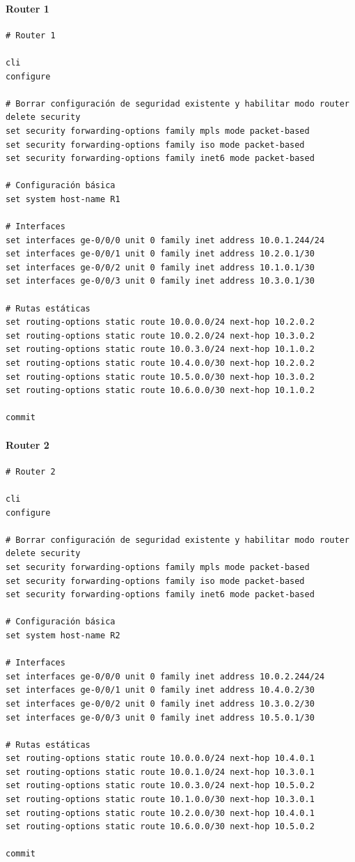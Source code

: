 \documentclass[%
    school=etsisi,%
    degree=61TI,%
]{upm-report}
\begin{document}
\paragraph{Router 1}

\begin{lstlisting}[breaklines]
# Router 1

cli
configure

# Borrar configuración de seguridad existente y habilitar modo router
delete security
set security forwarding-options family mpls mode packet-based
set security forwarding-options family iso mode packet-based
set security forwarding-options family inet6 mode packet-based

# Configuración básica
set system host-name R1

# Interfaces
set interfaces ge-0/0/0 unit 0 family inet address 10.0.1.244/24
set interfaces ge-0/0/1 unit 0 family inet address 10.2.0.1/30
set interfaces ge-0/0/2 unit 0 family inet address 10.1.0.1/30
set interfaces ge-0/0/3 unit 0 family inet address 10.3.0.1/30

# Rutas estáticas
set routing-options static route 10.0.0.0/24 next-hop 10.2.0.2
set routing-options static route 10.0.2.0/24 next-hop 10.3.0.2
set routing-options static route 10.0.3.0/24 next-hop 10.1.0.2
set routing-options static route 10.4.0.0/30 next-hop 10.2.0.2
set routing-options static route 10.5.0.0/30 next-hop 10.3.0.2
set routing-options static route 10.6.0.0/30 next-hop 10.1.0.2

commit
\end{lstlisting}

\paragraph{Router 2}

\begin{lstlisting}[breaklines]
# Router 2

cli
configure

# Borrar configuración de seguridad existente y habilitar modo router
delete security
set security forwarding-options family mpls mode packet-based
set security forwarding-options family iso mode packet-based
set security forwarding-options family inet6 mode packet-based

# Configuración básica
set system host-name R2

# Interfaces
set interfaces ge-0/0/0 unit 0 family inet address 10.0.2.244/24
set interfaces ge-0/0/1 unit 0 family inet address 10.4.0.2/30
set interfaces ge-0/0/2 unit 0 family inet address 10.3.0.2/30
set interfaces ge-0/0/3 unit 0 family inet address 10.5.0.1/30

# Rutas estáticas
set routing-options static route 10.0.0.0/24 next-hop 10.4.0.1
set routing-options static route 10.0.1.0/24 next-hop 10.3.0.1
set routing-options static route 10.0.3.0/24 next-hop 10.5.0.2
set routing-options static route 10.1.0.0/30 next-hop 10.3.0.1
set routing-options static route 10.2.0.0/30 next-hop 10.4.0.1
set routing-options static route 10.6.0.0/30 next-hop 10.5.0.2

commit   
\end{lstlisting}
\end{document}
